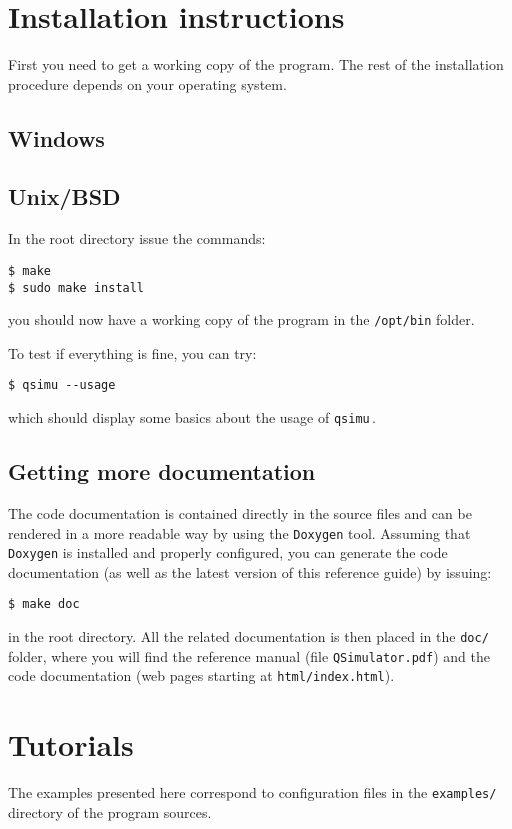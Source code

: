 \documentclass[12pt,a4paper]{report}
\newcommand{\qsimu}{\texttt{qsimu}\,}
\begin{document}
\section{Installation instructions}
First you need to get a working copy of the program.
The rest of the installation procedure depends on your operating system.

\subsection{Windows}

\subsection{Unix/BSD}
In the root directory issue the commands:
\begin{verbatim}
$ make
$ sudo make install
\end{verbatim}
you should now have a working copy of the program in the \texttt{/opt/bin} folder.

To test if everything is fine, you can try:
\begin{verbatim}
$ qsimu --usage
\end{verbatim}
which should display some basics about the usage of \qsimu.

\subsection{\label{sec:doc}Getting more documentation}
The code documentation is contained directly in the source files and can be rendered in a more readable way by using the \texttt{Doxygen} tool.
Assuming that \texttt{Doxygen} is installed and properly configured, you can generate the code documentation (as well as the latest version of this reference guide) by issuing:
\begin{verbatim}
$ make doc
\end{verbatim}
in the root directory.
All the related documentation is then placed in the \texttt{doc/} folder, where you will find the reference manual (file \texttt{QSimulator.pdf}) and the code documentation (web pages starting at \texttt{html/index.html}).

\section{Tutorials}
The examples presented here correspond to configuration files in the \texttt{examples/} directory of the program sources.
\end{document}
